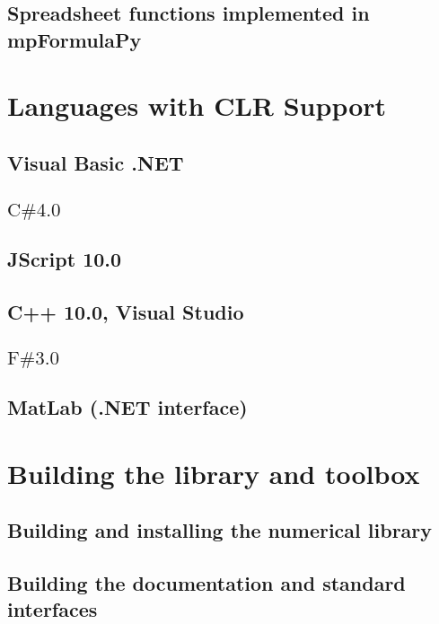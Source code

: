 \documentclass[12pt,a4paper,openany]{book}
\begin{document}
\section{Spreadsheet functions implemented in mpFormulaPy}

\chapter{Languages with CLR Support}

\section{Visual Basic .NET}

\section{\texorpdfstring {$\text {C\# 4.0 } $}{CSharp}}

\section{JScript 10.0}

\section{C++ 10.0, Visual Studio}

\section{\texorpdfstring {$\text {F\# 3.0 } $}{FSharp}}

\section{MatLab (.NET interface)}

\chapter{Building the library and toolbox}

\section{Building and installing the numerical library}

\section{Building the documentation and standard interfaces}
\end{document}
